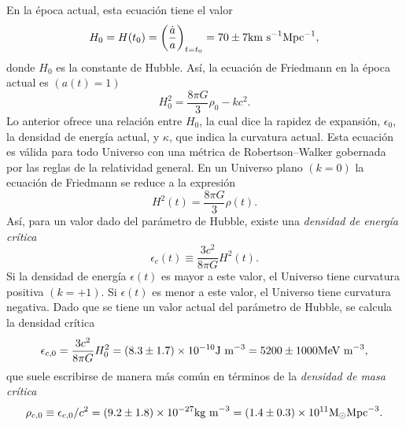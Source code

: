 \documentclass[a4paper,openright,12pt]{book}
\begin{document}
En la época actual, esta ecuación tiene el valor
\begin{equation}
H_{0} = H(t_{0}) = \left(\frac{\dot{a}}{a}\right) 
_{t=t_{0}} = 70 \pm 7 \textup{km s}^{-1} \textup{Mpc}^{-1},\label{eqn 1.20}
\end{equation}
donde $H_{0}$ es la constante de Hubble. Así, la ecuación de Friedmann en la época actual es $(a(t) = 1)$ 
\begin{equation}
H_{0}^{2} = \frac{8 \pi G}{3}\rho_{0} 
-k c^{2}. \label{eqn 1.21}
\end{equation}
Lo anterior ofrece una relación entre $H_{0}$, la cual dice la rapidez de expansión, $\epsilon_{0}$, la densidad de energía actual, y $\kappa$, que indica la curvatura actual. Esta ecuación es válida para todo Universo con una métrica de Robertson--Walker gobernada por las reglas de la relatividad general. En un Universo plano $(k = 0)$ la ecuación de Friedmann se reduce a la expresión
\begin{equation}
H^{2}(t)=\frac{8 \pi G}{3}\rho(t).\label{eqn 1.22}
\end{equation}
Así, para un valor dado del parámetro de Hubble, existe una \textit{densidad de energía crítica}
\begin{equation}
\epsilon_{c}(t) \equiv \frac{3 c^{2}}{8 \pi G} H^{2}(t).\label{eqn 1.23}
\end{equation}
Si la densidad de energía $\epsilon(t)$ es mayor a este valor, el Universo tiene curvatura positiva $(k = +1)$. Si $\epsilon(t)$ es menor a este valor, el Universo tiene curvatura negativa. Dado que se tiene un valor actual del parámetro de Hubble, se calcula la densidad crítica
\begin{equation}
\epsilon_{c,0} = \frac{3 c^{2}}{8 \pi G}H_{0}^{2}
=
(8.3 \pm 1.7) \times 10^{-10} \textup{J m} ^{-3}
=
5200 \pm 1000 \textup{MeV m} ^{-3},\label{eqn 1.24}
\end{equation}
que suele escribirse de manera más común en términos de la \textit{densidad de masa crítica}
\begin{equation}
\rho_{c,0} \equiv \epsilon_{c,0}/c^{2}
=
(9.2 \pm 1.8) \times 10^{-27} \textup{kg m}^{-3}
=
(1.4 \pm 0.3) \times 10^{11} \textup{M}_{\odot} \textup{Mpc}^{-3}.\label{eqn 1.25}
\end{equation}
\end{document}
